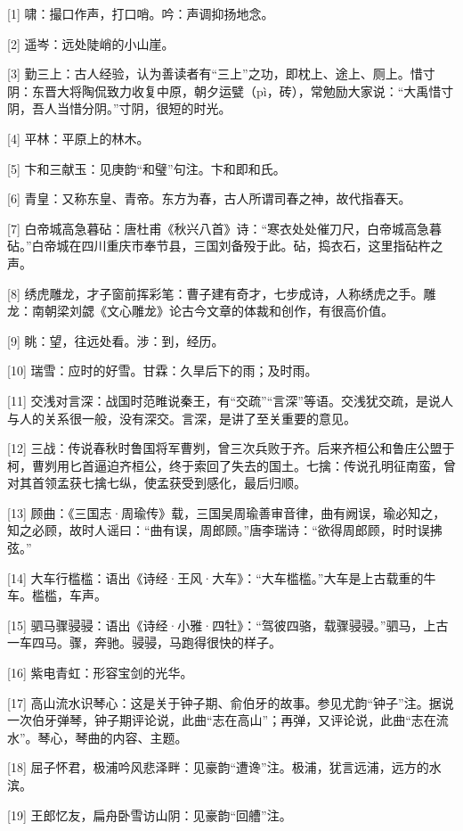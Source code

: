 \documentclass[12pt,UTF8]{ctexbook}
\begin{document}
[1] 啸：撮口作声，打口哨。吟：声调抑扬地念。

[2] 遥岑：远处陡峭的小山崖。

[3] 勤三上：古人经验，认为善读者有“三上”之功，即枕上、途上、厕上。惜寸阴：东晋大将陶侃致力收复中原，朝夕运甓（pì，砖），常勉励大家说：“大禹惜寸阴，吾人当惜分阴。”寸阴，很短的时光。

[4] 平林：平原上的林木。

[5] 卞和三献玉：见庚韵“和璧”句注。卞和即和氏。

[6] 青皇：又称东皇、青帝。东方为春，古人所谓司春之神，故代指春天。

[7] 白帝城高急暮砧：唐杜甫《秋兴八首》诗：“寒衣处处催刀尺，白帝城高急暮砧。”白帝城在四川重庆市奉节县，三国刘备殁于此。砧，捣衣石，这里指砧杵之声。

[8] 绣虎雕龙，才子窗前挥彩笔：曹子建有奇才，七步成诗，人称绣虎之手。雕龙：南朝梁刘勰《文心雕龙》论古今文章的体裁和创作，有很高价值。

[9] 眺：望，往远处看。涉：到，经历。

[10] 瑞雪：应时的好雪。甘霖：久旱后下的雨；及时雨。

[11] 交浅对言深：战国时范睢说秦王，有“交疏”“言深”等语。交浅犹交疏，是说人与人的关系很一般，没有深交。言深，是讲了至关重要的意见。

[12] 三战：传说春秋时鲁国将军曹刿，曾三次兵败于齐。后来齐桓公和鲁庄公盟于柯，曹刿用匕首逼迫齐桓公，终于索回了失去的国土。七擒：传说孔明征南蛮，曾对其首领孟获七擒七纵，使孟获受到感化，最后归顺。

[13] 顾曲：《三国志·周瑜传》载，三国吴周瑜善审音律，曲有阙误，瑜必知之，知之必顾，故时人谣曰：“曲有误，周郎顾。”唐李瑞诗：“欲得周郎顾，时时误拂弦。”

[14] 大车行槛槛：语出《诗经·王风·大车》：“大车槛槛。”大车是上古载重的牛车。槛槛，车声。

[15] 驷马骤骎骎：语出《诗经·小雅·四牡》：“驾彼四骆，载骤骎骎。”驷马，上古一车四马。骤，奔驰。骎骎，马跑得很快的样子。

[16] 紫电青虹：形容宝剑的光华。

[17] 高山流水识琴心：这是关于钟子期、俞伯牙的故事。参见尤韵“钟子”注。据说一次伯牙弹琴，钟子期评论说，此曲“志在高山”；再弹，又评论说，此曲“志在流水”。琴心，琴曲的内容、主题。

[18] 屈子怀君，极浦吟风悲泽畔：见豪韵“遭谗”注。极浦，犹言远浦，远方的水滨。

[19] 王郎忆友，扁舟卧雪访山阴：见豪韵“回艚”注。
\end{document}
